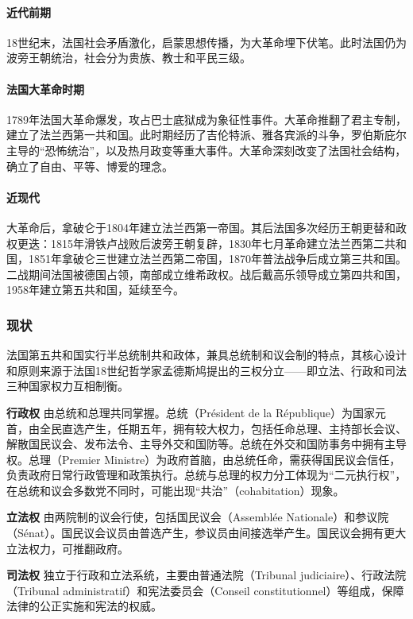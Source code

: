 \paragraph{近代前期} 18世纪末，法国社会矛盾激化，启蒙思想传播，为大革命埋下伏笔。此时法国仍为波旁王朝统治，社会分为贵族、教士和平民三级。

\paragraph{法国大革命时期} 1789年法国大革命爆发，攻占巴士底狱成为象征性事件。大革命推翻了君主专制，建立了法兰西第一共和国。此时期经历了吉伦特派、雅各宾派的斗争，罗伯斯庇尔主导的“恐怖统治”，以及热月政变等重大事件。大革命深刻改变了法国社会结构，确立了自由、平等、博爱的理念。

\paragraph{近现代} 大革命后，拿破仑于1804年建立法兰西第一帝国。其后法国多次经历王朝更替和政权更迭：1815年滑铁卢战败后波旁王朝复辟，1830年七月革命建立法兰西第二共和国，1851年拿破仑三世建立法兰西第二帝国，1870年普法战争后成立第三共和国。二战期间法国被德国占领，南部成立维希政权。战后戴高乐领导成立第四共和国，1958年建立第五共和国，延续至今。

\subsubsection{现状}

法国第五共和国实行半总统制共和政体，兼具总统制和议会制的特点，其核心设计和原则来源于法国18世纪哲学家孟德斯鸠提出的三权分立——即立法、行政和司法三种国家权力互相制衡。

\textbf{行政权} 由总统和总理共同掌握。总统（Président de la République）为国家元首，由全民直选产生，任期五年，拥有较大权力，包括任命总理、主持部长会议、解散国民议会、发布法令、主导外交和国防等。总统在外交和国防事务中拥有主导权。总理（Premier Ministre）为政府首脑，由总统任命，需获得国民议会信任，负责政府日常行政管理和政策执行。总统与总理的权力分工体现为“二元执行权”，在总统和议会多数党不同时，可能出现“共治”（cohabitation）现象。

\textbf{立法权} 由两院制的议会行使，包括国民议会（Assemblée Nationale）和参议院（Sénat）。国民议会议员由普选产生，参议员由间接选举产生。国民议会拥有更大立法权力，可推翻政府。

\textbf{司法权} 独立于行政和立法系统，主要由普通法院（Tribunal judiciaire）、行政法院（Tribunal administratif）和宪法委员会（Conseil constitutionnel）等组成，保障法律的公正实施和宪法的权威。

